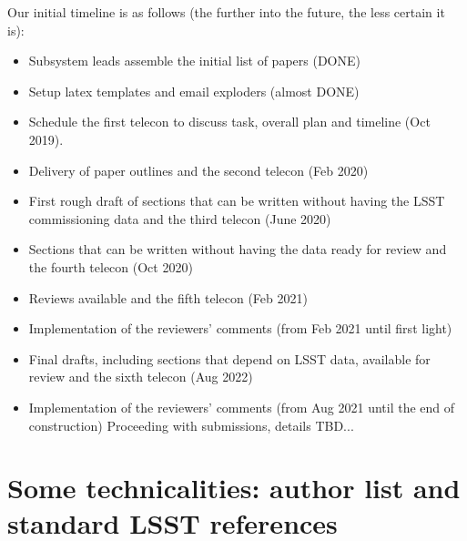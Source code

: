 Our initial timeline is as follows (the further into the future, the less certain it is): 
\begin{itemize} 
\item 
Subsystem leads assemble the initial list of papers (DONE)
\item
Setup latex templates and email exploders (almost DONE)
\item
Schedule the first telecon to discuss task, overall plan and timeline (Oct 2019).
\item 
Delivery of paper outlines and the second telecon (Feb 2020) 
\item
First rough draft of sections that can be written without having the LSST commissioning
data and the third telecon (June 2020)
\item 
Sections that can be written without having the data ready for review and
the fourth telecon (Oct 2020) 
\item
Reviews available and the fifth telecon (Feb 2021)
\item
Implementation of the reviewers' comments (from Feb 2021 until first light) 
\item 
Final drafts, including sections that depend on LSST data, available for
review and the sixth telecon (Aug 2022)
\item
Implementation of the reviewers' comments (from Aug 2021  until the end of construction)
Proceeding with submissions, details TBD...
\end{itemize}




\section{Some technicalities: author list and standard LSST references} 


